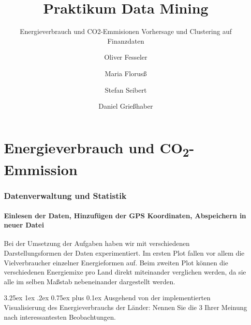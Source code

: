 \documentclass[12pt,a4paper]{scrartcl}
\makeatletter
\renewcommand\subparagraph{\@startsection{subparagraph}{5}{\parindent}%
    {3.25ex \@plus1ex \@minus .2ex}%
    {0.75ex plus 0.1ex}%
    {\normalfont\normalsize\bfseries}}
\makeatother
\begin{document}
\title{Praktikum Data Mining}
\subtitle{Energieverbrauch und CO2-Emmisionen \newline Vorhersage und Clustering auf Finanzdaten}
\author{Oliver Fesseler \and Maria Florus\ss \and Stefan Seibert \and  Daniel Grie\ss haber}
\maketitle
\newpage
\tableofcontents
\newpage

\part*{Energieverbrauch und CO\textsubscript{2}-Emmission}

\section*{Datenverwaltung und Statistik}
\subsection*{Einlesen der Daten, Hinzuf\"ugen der GPS Koordinaten, Abspeichern in neuer Datei}
Bei der Umsetzung der Aufgaben haben wir mit verschiedenen Darstellungsformen der Daten experimentiert. Im ersten Plot fallen vor allem die Vielverbraucher einzelner Energieformen auf. Beim zweiten Plot k\"onnen die verschiedenen Energiemixe pro Land direkt miteinander verglichen werden, da sie alle im selben Ma\ss stab nebeneinander dargestellt werden.

\subparagraph{ Ausgehend von der implementierten Visualisierung des Energieverbrauchs der L\"ander: Nennen Sie die 3 Ihrer Meinung nach interessantesten Beobachtungen.}
\end{document}
